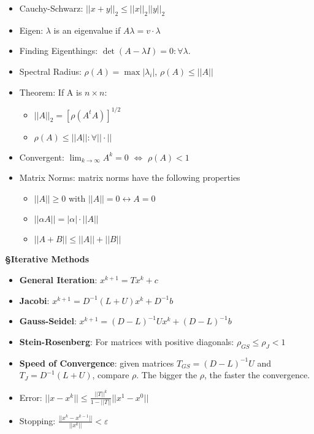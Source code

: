 \documentclass{article}
\begin{document}
\begin{tcolorbox}[colframe=black,colback=white,boxrule=0.3pt,arc=1pt,
left=0pt,right=0pt,top=0pt,bottom=0pt]
\begin{minipage}[t]{0.49\textwidth}
\begin{itemize}
\item Cauchy-Schwarz: $||x+y||_2\leq||x||_2||y||_2$
\item Eigen: $\lambda$ is an eigenvalue if $A\lambda=v \cdot \lambda$
\item Finding Eigenthings: $\det (A-\lambda I)=0:\forall \lambda$.
\item Spectral Radius: $\rho(A)=\max|\lambda_i|$, $\rho(A)\leq||A||$
\item Theorem: If A is $n\times n$:
\begin{itemize}
    \item $||A||_2=[\rho(A^tA)]^{1/2}$
    \item $\rho(A) \le ||A||:\forall||\cdot||$
\end{itemize}
\item Convergent: $\lim_{k\to\infty}A^k=0$ $\Leftrightarrow$ $\rho(A)<1$
\item Matrix Norms: matrix norms have the following properties
\begin{itemize}
    \item $||A||\geq 0$ with $||A||=0 \leftrightarrow A=0$
    \item $||\alpha A || = |\alpha|\cdot ||A||$
    \item $||A+B|| \leq ||A|| + ||B||$
\end{itemize}
\end{itemize}

\textbf{\S Iterative Methods}
\begin{itemize}
\item \textbf{General Iteration}: $x^{k+1}=Tx^k+c$
\item \textbf{Jacobi}: $x^{k+1}=D^{-1}(L+U)x^k+D^{-1}b$
\item \textbf{Gauss-Seidel}: $x^{k+1}=(D-L)^{-1}Ux^k+(D-L)^{-1}b$
\item \textbf{Stein-Rosenberg}: For matrices with positive diagonals: $\rho_{GS}\leq\rho_J<1$
\item \textbf{Speed of Convergence}: given matrices $T_{GS}=(D-L)^{-1}U$ and $T_J =D^{-1}(L+U)$, compare $\rho$. The bigger the $\rho$, the faster the convergence.
\item Error: $||x-x^k||\leq\frac{||T||^k}{1-||T||}||x^1-x^0||$
\item Stopping: $\frac{||x^k-x^{k-1}||}{||x^k||}<\varepsilon$
\end{itemize}


\end{minipage}
\end{tcolorbox}
\end{document}
